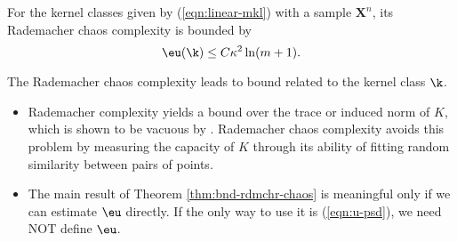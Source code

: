 \begin{theorem} \label{thm:u-mkl}
For the kernel classes given by (\ref{eqn:linear-mkl}) with a sample $\mathbf X^n$,
its Rademacher chaos complexity is bounded by
\[
\eu(\k) \leq C\kappa^2\ln(m + 1).
\]
\end{theorem}


\begin{remark} \label{rmk:rdmchr-chaos}
The Rademacher chaos complexity leads to bound related to the kernel
class $\k$.
\begin{itemize}
  \item Rademacher complexity yields a bound over the trace or induced norm of $K$,
   which is shown to be vacuous by \cite{colt/SrebroB06}. Rademacher chaos
   complexity avoids this problem by measuring the capacity of $K$ through its
   ability of fitting random similarity between pairs of points.
  \item The main result of Theorem \ref{thm:bnd-rdmchr-chaos} is meaningful only if we can
    estimate $\eu$ directly. If the only way to use it is (\ref{eqn:u-psd}), we need
    NOT define $\eu$.
\end{itemize}
\end{remark} 
